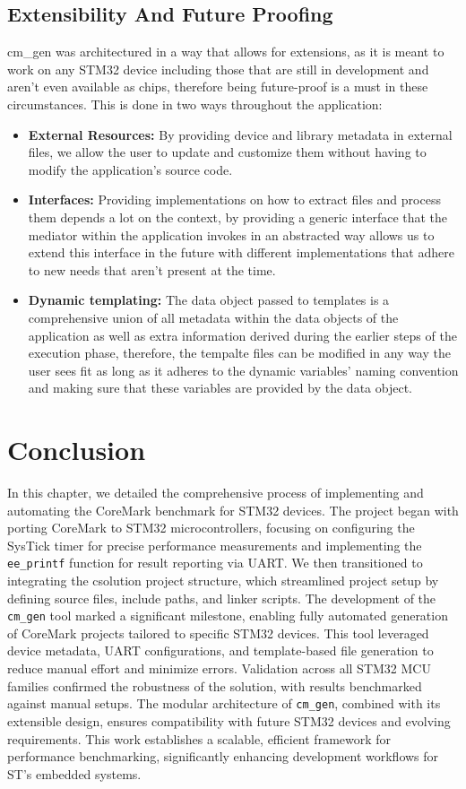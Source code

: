 \subsection{Extensibility And Future Proofing}
\label{sec:fut_ext}
cm\_gen was architectured in a way that allows for extensions, as it is meant to work on any STM32 device including those that are still in development and aren't even available as chips, therefore being future-proof is a must in these circumstances. This is done in two ways throughout the application:
\begin{itemize}
    \item  \textbf{External Resources:} By providing device and library metadata in external files, we allow the user to update and customize them without having to modify the application's source code.
    \item  \textbf{Interfaces:} Providing implementations on how to extract files and process them depends a lot on the context, by providing a generic interface that the mediator within the application invokes in an abstracted way allows us to extend this interface in the future with different implementations that adhere to new needs that aren't present at the time.
    \item  \textbf{Dynamic templating:} The data object passed to templates is a comprehensive union of all metadata within the data objects of the application as well as extra information derived during the earlier steps of the execution phase, therefore, the tempalte files can be modified in any way the user sees fit as long as it adheres to the dynamic variables' naming convention and making sure that these variables are provided by the data object.
\end{itemize}
\section*{Conclusion}
In this chapter, we detailed the comprehensive process of implementing and automating the CoreMark benchmark for STM32 devices. The project began with porting CoreMark to STM32 microcontrollers, focusing on configuring the SysTick timer for precise performance measurements and implementing the \texttt{ee\_printf} function for result reporting via UART. We then transitioned to integrating the csolution project structure, which streamlined project setup by defining source files, include paths, and linker scripts. The development of the \texttt{cm\_gen} tool marked a significant milestone, enabling fully automated generation of CoreMark projects tailored to specific STM32 devices. This tool leveraged device metadata, UART configurations, and template-based file generation to reduce manual effort and minimize errors. Validation across all STM32 MCU families confirmed the robustness of the solution, with results benchmarked against manual setups. The modular architecture of \texttt{cm\_gen}, combined with its extensible design, ensures compatibility with future STM32 devices and evolving requirements. This work establishes a scalable, efficient framework for performance benchmarking, significantly enhancing development workflows for ST's embedded systems.
